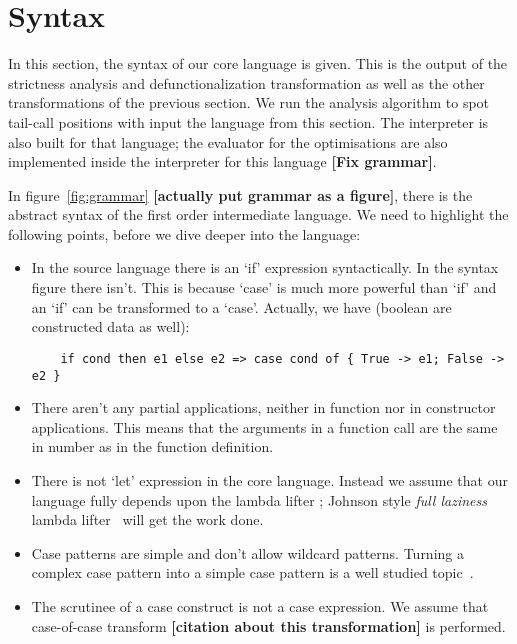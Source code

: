 \documentclass[diploma]{softlab-thesis}
\begin{document}
\section {Syntax}
In this section, the syntax of our core language is given.
This is the output of the strictness analysis and 
defunctionalization transformation as well as the other transformations of the previous 
section. We run the analysis algorithm to spot tail-call positions with input 
the language from this section. The interpreter is also built for that language; the evaluator for 
the optimisations are also implemented inside the interpreter for this language \textbf{[Fix grammar]}.
\newline
\par In figure~\ref{fig:grammar} \textbf{[actually put grammar as a figure]}, there is the abstract syntax of 
the first order intermediate language.
We need to highlight the following points, before we dive deeper into the language:
\begin{itemize}
  \item In the source language there is an `if' expression syntactically. In the syntax figure there isn't.
  This is because `case' is much more powerful than `if' and an `if' can be transformed to a `case'. 
  Actually, we have (boolean are constructed data as well):
  \begin{verbatim}
    if cond then e1 else e2 => case cond of { True -> e1; False -> e2 }
  \end{verbatim}
  \item There aren't any partial applications, neither in function nor in constructor applications.
  This means that the arguments in a function call are the same in number as in the function definition.
  \item There is not `let' expression in the core language. Instead we assume that our language 
  fully depends upon the lambda lifter ; Johnson style \textit{full laziness} lambda lifter~\cite{Johnsson:1985:LLT:5280.5292}
  will get the work done.
  \item Case patterns are simple and don't allow wildcard patterns. Turning a complex case pattern into
  a simple case pattern is a well studied topic~\cite{Au85,Wadler87}.
  \item The scrutinee of a case construct is not a case expression. We assume that case-of-case transform 
  \textbf{[citation about this transformation]} is performed.
\end{itemize}
\end{document}
